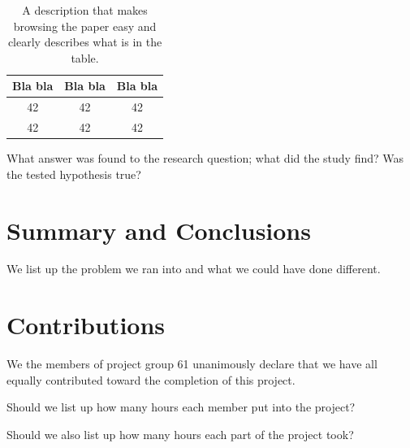 \documentclass[a4paper,12pt]{article}
\begin{document}
\begin{table}
\begin{center}
\begin{tabular}{|c|c|c|}
\hline
Bla bla & Bla bla & Bla bla \\ \hline
42 & 42 & 42 \\ \hline
42 & 42 & 42 \\ \hline
\end{tabular}
\caption{A description that makes browsing the paper easy and clearly 
describes what is in the table.}
\label{tab:results}
\end{center}
\end{table}

What answer was found to the research question; what did the study find? Was the tested hypothesis true?

\section{Summary and Conclusions}
\label{sec:summary}



We list up the problem we ran into and what we could have done different. 




\section{Contributions}
\label{sec:contributions}
We the members of project group 61 unanimously declare that 
we have all equally contributed toward the completion of this
project.

Should we list up how many hours each member put into the project?

Should we also list up how many hours each part of the project took?





\end{document}
